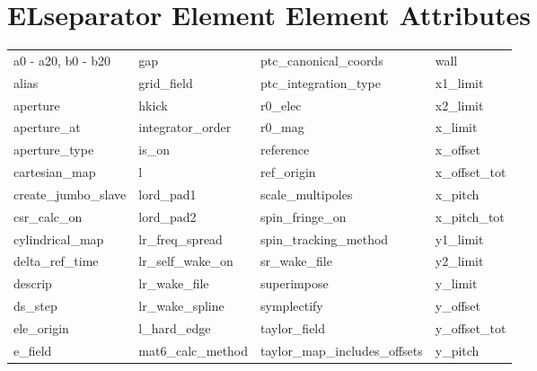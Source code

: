 \section{ELseparator Element Element Attributes}
 \label{s:list.elseparator}
 
 \begin{tabular}{llll} \toprule
a0 - a20, b0 - b20          & gap                         & ptc_canonical_coords        & wall                        \\
alias                       & grid_field                  & ptc_integration_type        & x1_limit                    \\
aperture                    & hkick                       & r0_elec                     & x2_limit                    \\
aperture_at                 & integrator_order            & r0_mag                      & x_limit                     \\
aperture_type               & is_on                       & reference                   & x_offset                    \\
cartesian_map               & l                           & ref_origin                  & x_offset_tot                \\
create_jumbo_slave          & lord_pad1                   & scale_multipoles            & x_pitch                     \\
csr_calc_on                 & lord_pad2                   & spin_fringe_on              & x_pitch_tot                 \\
cylindrical_map             & lr_freq_spread              & spin_tracking_method        & y1_limit                    \\
delta_ref_time              & lr_self_wake_on             & sr_wake_file                & y2_limit                    \\
descrip                     & lr_wake_file                & superimpose                 & y_limit                     \\
ds_step                     & lr_wake_spline              & symplectify                 & y_offset                    \\
ele_origin                  & l_hard_edge                 & taylor_field                & y_offset_tot                \\
e_field                     & mat6_calc_method            & taylor_map_includes_offsets & y_pitch                     \\

\end{tabular}
